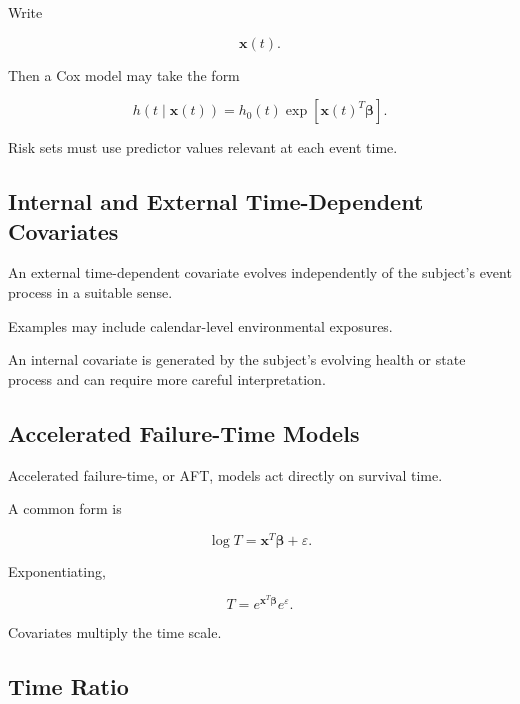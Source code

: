 Write

\[
\boxed{
\mathbf{x}(t).
}
\]

Then a Cox model may take the form

\[
\boxed{
h
(
t\mid\mathbf{x}(t)
)
=
h_0(t)
\exp
[
\mathbf{x}(t)^T
\boldsymbol{\beta}
].
}
\]

Risk sets must use predictor values relevant at each event time.

\subsection{Internal and External Time-Dependent Covariates}
\label{subsec:internal-external-time-covariates}

An external time-dependent covariate evolves independently of the
subject's event process in a suitable sense.

Examples may include calendar-level environmental exposures.

An internal covariate is generated by the subject's evolving health or
state process and can require more careful interpretation.

\subsection{Accelerated Failure-Time Models}
\label{subsec:accelerated-failure-time}

Accelerated failure-time, or AFT, models act directly on survival time.

A common form is

\[
\boxed{
\log T
=
\mathbf{x}^T
\boldsymbol{\beta}
+
\varepsilon.
}
\]

Exponentiating,

\[
\boxed{
T
=
e^{\mathbf{x}^T\boldsymbol{\beta}}
e^\varepsilon.
}
\]

Covariates multiply the time scale.

\subsection{Time Ratio}
\label{subsec:time-ratio}

